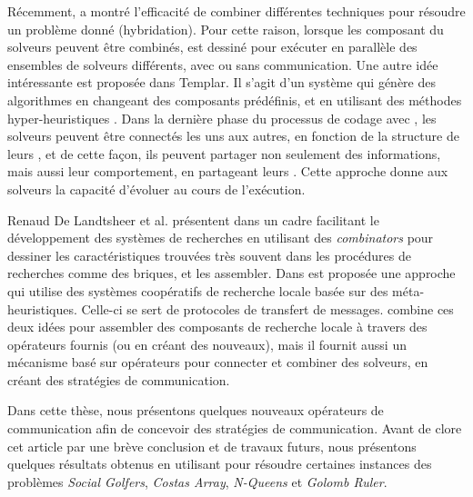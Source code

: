 R\'ecemment, \cite{El-Ghazali2013} a montr\'e l'efficacit\'e de combiner diff\'erentes techniques pour r\'esoudre un probl\`eme donn\'e (hybridation). Pour cette raison, lorsque les composant du solveurs peuvent \^etre combin\'es, \posl{} est dessin\'e pour ex\'ecuter en parall\`ele des ensembles de solveurs diff\'erents, avec ou sans communication. Une autre id\'ee int\'eressante est propos\'ee dans {\sc Templar}. Il s'agit d'un syst\`eme qui g\'en\`ere des algorithmes en changeant des composants pr\'ed\'efinis, et en utilisant des m\'ethodes hyper-heuristiques \cite{Swan2015}. Dans la derni\`ere phase du processus de codage avec \posl{}, les solveurs peuvent \^etre connect\'es les uns aux autres, en fonction de la structure de leurs \opchs, et de cette fa\c{c}on, ils peuvent partager non seulement des informations, mais aussi leur comportement, en partageant leurs \oms. Cette approche donne aux solveurs la capacit\'e d'\'evoluer au cours de l'ex\'ecution.

Renaud De Landtsheer et al. pr\'esentent dans \cite{Landtsheer2015} un cadre facilitant le d\'eveloppement des syst\`emes de recherches en utilisant des \textit{combinators} pour dessiner les caract\'eristiques trouv\'ees tr\`es souvent dans les proc\'edures de recherches comme des briques, et les assembler. Dans \cite{Martin2016} est propos\'ee une approche qui utilise des syst\`emes coop\'eratifs de recherche locale bas\'ee sur des m\'eta-heuristiques. Celle-ci se sert de protocoles de transfert de messages. \posl{} combine ces deux id\'ees pour assembler des composants de recherche locale \`a travers des op\'erateurs fournis (ou en cr\'eant des nouveaux), mais il fournit aussi un m\'ecanisme bas\'e sur op\'erateurs pour connecter et combiner des solveurs, en cr\'eant des strat\'egies de communication.

Dans cette th\`ese, nous pr\'esentons quelques nouveaux op\'erateurs de communication afin de concevoir des strat\'egies de communication. Avant de clore cet article par une br\`eve conclusion et de travaux futurs, nous pr\'esentons quelques r\'esultats obtenus en utilisant \posl{} pour r\'esoudre certaines instances des probl\`emes {\it Social Golfers}, {\it Costas Array}, \textit{N-Queens} et \textit{Golomb Ruler}.
